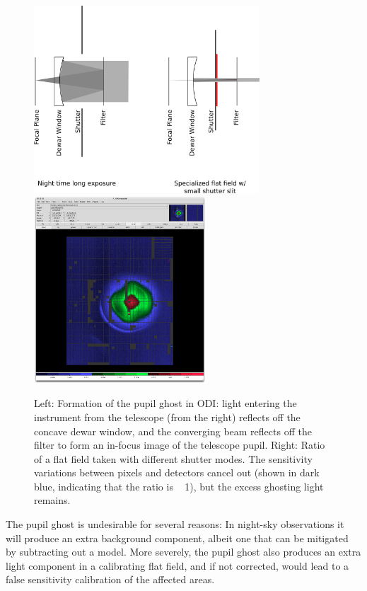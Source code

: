 \documentclass[]{spieman}
\begin{document}
\begin{figure}
\centering
\includegraphics[height=7cm]{images/odishutterpupilghostsupression.png}
\hspace{0.75cm} \includegraphics[height=7cm]{images/odi_layeronepg.png}
	
\caption{ \label{fig_pupilghost}Left: Formation of the pupil ghost in ODI: 
    light entering the instrument from the telescope (from the right) reflects off
    the concave dewar window, and the converging beam reflects off the filter to form
    an in-focus image of the telescope pupil. Right: Ratio of a flat field taken
    with different shutter modes. The sensitivity variations between pixels and
    detectors cancel out (shown in dark blue, indicating that the ratio is ~ 1),
    but the excess ghosting light remains.}
\end{figure}

The pupil ghost is undesirable for several reasons: In night-sky observations it
will produce an extra background component, albeit one that can be mitigated by
subtracting out a model. More severely, the pupil ghost also produces an extra
light component in a calibrating flat field, and if not corrected, would lead to
a false sensitivity calibration of the affected areas.
\end{document}
